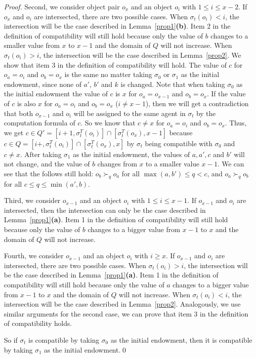 \begin{proof}
    Second, we consider object pair $o_{x}$ and an object $o_i$ with $1\leq i \leq x-2$.
    If $o_{x}$ and $o_i$ are intersected, there are two possible cases.
    When $\sigma_t(o_i)<i$, the
    intersection will be the case described in Lemma~\ref{prop1}\textbf{(b)}.
    Item 2 in the definition of compatibility will still hold because only the value of $b$ changes to a smaller value from $x$ to $x-1$
    and the domain of $Q$ will not increase.
    When $\sigma_t(o_i)>i$, the
    intersection will be the case described in Lemma~\ref{prop2}.
    We show that item 3 in the definition of compatibility will hold.
    The value of $c$ for $o_a=o_i$ and $o_b=o_x$ is the same no matter taking $\sigma_0$ or $\sigma_1$ as the initial endowment,
    since none of $a'$, $b'$ and $k$ is changed. Note that when taking $\sigma_0$ as the initial endowment  the value of $c$ is $x$ for $o_a=o_{x-1}$ and $o_b=o_x$. If the value of $c$ is also $x$ for $o_a=o_{i}$ and $o_b=o_x$ ($i\neq x-1$), then we will get a contradiction that both $o_{x-1}$ and $o_i$ will be assigned to the same agent in $\sigma_t$ by the computation formula of $c$.
    So we know that $c\neq x$ for $o_a=o_{i}$ and $o_b=o_x$. Thus, we get $c\in Q'=[i+1, \sigma _t^T(o_i)]\cap [\sigma _t^T(o_x) ,x-1]$ because  $c\in Q=[i+, \sigma _t^T(o_i)]\cap [\sigma _t^T(o_x),x]$ by $\sigma _t$ being compatible with $\sigma _0$ and $c\neq x$.
    After taking $\sigma_1$ as the initial endowment, the values of $a, a',c$ and $b'$ will not change, and the value of $b$ changes from $x$ to a smaller value $x-1$. We can see that the follows still hold:
    $o_b \succ_q o_a$ for all $\max(a,b')\leq q < c$, and $o_a \succ_q o_b$ for all $c \leq q \leq \min(a',b)$.


    Third, we consider $o_{x-1}$ and an object $o_i$ with $1\leq i \leq x-1$.
    If $o_{x-1}$ and $o_i$ are intersected, then the
    intersection can only be the case described in Lemma~\ref{prop1}\textbf{(a)}.
    Item 1 in the definition of compatibility will still hold because only the value of $b$ changes to a bigger value from $x-1$ to $x$ and the domain of $Q$ will not increase.

    Fourth, we consider $o_{x-1}$ and an object $o_i$ with $i \geq x$.
    If $o_{x-1}$ and $o_i$ are intersected, there are two possible cases.
    When $\sigma_t(o_i)>i$, the
    intersection will be the case described in Lemma~\ref{prop1}\textbf{(a)}.
    Item 1 in the definition of compatibility will still hold because only the value of $a$ changes to a bigger value from $x-1$ to $x$
    and the domain of $Q$ will not increase.
    When $\sigma_t(o_i)<i$, the
    intersection will be the case described in Lemma~\ref{prop2}. Analogously, we use similar arguments for the second case,
    we can prove that item 3 in the definition of compatibility holds.

    So if $\sigma _t$ is compatible by taking $\sigma _0$ as the initial endowment, then it is compatible by taking $\sigma _1$ as the initial endowment.\qed
\end{proof}

